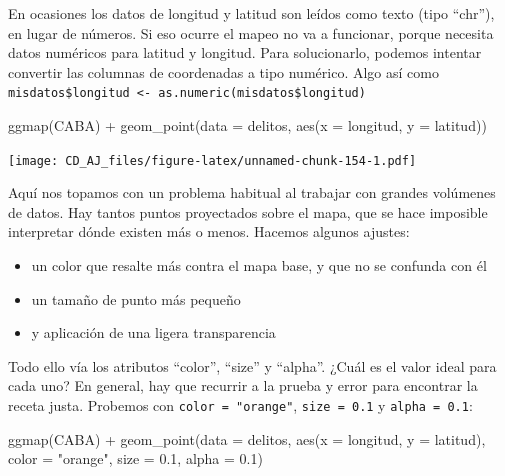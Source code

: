 \documentclass[
]{book}
\newenvironment{Shaded}{\begin{snugshade}}{\end{snugshade}}
\newcommand{\AttributeTok}[1]{\textcolor[rgb]{0.77,0.63,0.00}{#1}}
\newcommand{\FloatTok}[1]{\textcolor[rgb]{0.00,0.00,0.81}{#1}}
\newcommand{\FunctionTok}[1]{\textcolor[rgb]{0.00,0.00,0.00}{#1}}
\newcommand{\NormalTok}[1]{#1}
\newcommand{\SpecialCharTok}[1]{\textcolor[rgb]{0.00,0.00,0.00}{#1}}
\newcommand{\StringTok}[1]{\textcolor[rgb]{0.31,0.60,0.02}{#1}}
\providecommand{\tightlist}{%
  \setlength{\itemsep}{0pt}\setlength{\parskip}{0pt}}
\begin{document}
En ocasiones los datos de longitud y latitud son leídos como texto (tipo ``chr''), en lugar de números. Si eso ocurre el mapeo no va a funcionar, porque necesita datos numéricos para latitud y longitud. Para solucionarlo, podemos intentar convertir las columnas de coordenadas a tipo numérico. Algo así como \texttt{misdatos\$longitud\ \textless{}-\ as.numeric(misdatos\$longitud)}

\begin{Shaded}
\begin{Highlighting}[]
\FunctionTok{ggmap}\NormalTok{(CABA) }\SpecialCharTok{+}
    \FunctionTok{geom\_point}\NormalTok{(}\AttributeTok{data =}\NormalTok{ delitos, }\FunctionTok{aes}\NormalTok{(}\AttributeTok{x =}\NormalTok{ longitud, }\AttributeTok{y =}\NormalTok{ latitud))}
\end{Highlighting}
\end{Shaded}

\texttt{[image: CD\_AJ\_files/figure-latex/unnamed-chunk-154-1.pdf]}

Aquí nos topamos con un problema habitual al trabajar con grandes volúmenes de datos. Hay tantos puntos proyectados sobre el mapa, que se hace imposible interpretar dónde existen más o menos. Hacemos algunos ajustes:

\begin{itemize}
\tightlist
\item
  un color que resalte más contra el mapa base, y que no se confunda con él
\item
  un tamaño de punto más pequeño
\item
  y aplicación de una ligera transparencia
\end{itemize}

Todo ello vía los atributos ``color'', ``size'' y ``alpha''. ¿Cuál es el valor ideal para cada uno? En general, hay que recurrir a la prueba y error para encontrar la receta justa. Probemos con \texttt{color\ =\ "orange"}, \texttt{size\ =\ 0.1} y \texttt{alpha\ =\ 0.1}:

\begin{Shaded}
\begin{Highlighting}[]
\FunctionTok{ggmap}\NormalTok{(CABA) }\SpecialCharTok{+}
    \FunctionTok{geom\_point}\NormalTok{(}\AttributeTok{data =}\NormalTok{ delitos, }\FunctionTok{aes}\NormalTok{(}\AttributeTok{x =}\NormalTok{ longitud, }\AttributeTok{y =}\NormalTok{ latitud),}
               \AttributeTok{color =} \StringTok{"orange"}\NormalTok{, }\AttributeTok{size =} \FloatTok{0.1}\NormalTok{, }\AttributeTok{alpha =} \FloatTok{0.1}\NormalTok{)}
\end{Highlighting}
\end{Shaded}
\end{document}
